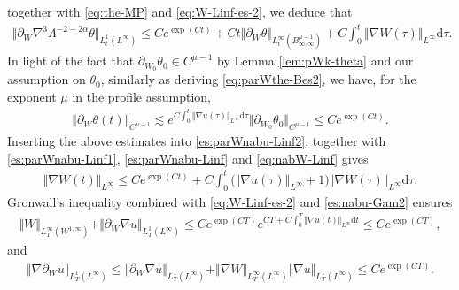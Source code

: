 \documentclass[reqno,11pt,a4paper]{amsart}
\newcommand{\dd}{\mathrm{d}}
\def \p {\partial}
\begin{document}
together with \eqref{eq:the-MP} and \eqref{eq:W-Linf-es-2}, we deduce that
\begin{align}
  \big\Vert \partial_W \nabla^3\Lambda^{-2-2\alpha} \theta \big\Vert _{L^1_t(L^\infty)} 
  \leq Ce^{\exp(Ct)}
  + Ct\Vert \p_W\theta\Vert _{L_t^\infty(B^{\mu-1}_{\infty,\infty})} 
  + C\int_0^t \Vert \nabla W(\tau)\Vert _{L^\infty} \dd\tau.\label{es:parWnabu-Linf2}
\end{align}
In light of the fact that $\partial_{W_0}\theta_0\in C^{\mu-1}$ by Lemma \ref{lem:pWk-theta} 
and our assumption on $\theta_0$, similarly as deriving \eqref{eq:parWthe-Bes2}, we have, for the exponent $\mu$ in the profile assumption,
\begin{align*}%
  \Vert \partial_W \theta(t)\Vert _{C^{\mu-1}} \lesssim   e^{C \int_0^t \Vert \nabla u(\tau)\Vert _{L^\infty}
  \dd \tau} \Vert \partial_{W_0}\theta_0\Vert _{C^{\mu-1}} \leq C  e^{\exp(C t)}.
\end{align*}
Inserting the above estimates into \eqref{es:parWnabu-Linf2}, together with \eqref{es:parWnabu-Linf1}, \eqref{es:parWnabu-Linf} and \eqref{eq:nabW-Linf} gives
\begin{align*}
  \Vert \nabla W(t)\Vert _{L^\infty} \leq C e^{\exp(Ct)}
  + C \int_0^t\big(\Vert \nabla u(\tau)\Vert _{L^\infty} + 1\big)\Vert \nabla W(\tau)\Vert _{L^\infty} \mathrm{d} \tau .
\end{align*}
Gronwall's inequality combined with \eqref{eq:W-Linf-es-2} and \eqref{es:nabu-Gam2} ensures 
\begin{align}\label{eq:W-W1inf-bdd}
  \Vert W\Vert _{L^\infty_T(W^{1,\infty})} 
  + \Vert \partial_W \nabla u\Vert _{L^1_T(L^\infty)}
  \leq C e^{\exp(CT)} e^{CT+C\int_0^T\Vert \nabla u(t)\Vert _{L^\infty} \dd t} 
  \leq Ce^{\exp (CT)},
\end{align}
and
\begin{align}\label{eq:nab-paw-u-L1Linf}
  \Vert \nabla \partial_W u\Vert _{L^1_T(L^\infty)}
  \leq \Vert \partial_W \nabla u\Vert _{L^1_T(L^\infty)}
  + \Vert \nabla W\Vert _{L^\infty_T(L^\infty)} \Vert \nabla u\Vert _{L^1_T(L^\infty)}
  \leq C e^{\exp(CT)}.
\end{align}
\end{document}
